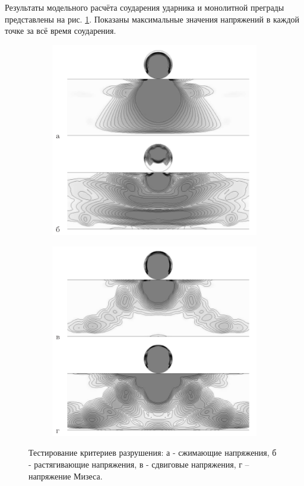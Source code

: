 Результаты модельного расчёта соударения ударника и монолитной преграды представлены на рис. \ref{pic:destruction_test}. Показаны максимальные значения напряжений в каждой точке за всё время соударения.

\begin{figure}[htp]
\centering
\begin{subfigure}[b]{0.45\textwidth}
\centering
\includegraphics[width=\textwidth]{png/destruction_test-1.png}
\end{subfigure}
\begin{subfigure}[b]{0.45\textwidth}
\centering
\includegraphics[width=\textwidth]{png/destruction_test-2.png}
\end{subfigure}
\caption{Тестирование критериев разрушения: а - сжимающие напряжения, б - растягивающие напряжения, в - сдвиговые напряжения, г – напряжение Мизеса.}
\label{pic:destruction_test}
\end{figure}


